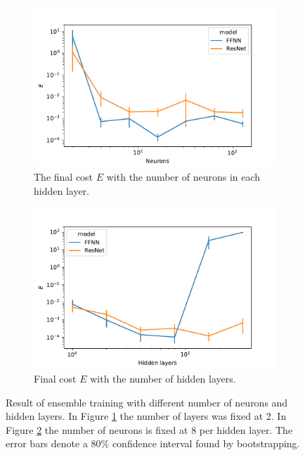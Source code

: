 \begin{figure}
    \begin{subfigure}[t]{0.5\textwidth}
        \centering
        \includegraphics[width=\linewidth]{figures/curve_1/eks_7/neurons_error.pdf}
        \caption{The final cost \(E\) with the number of neurons in each hidden layer.} \label{fig:curve_1_neuron_error} \end{subfigure}
    \begin{subfigure}[t]{0.5\textwidth}
        \centering
        \includegraphics[width=\linewidth]{figures/curve_1/eks_7/layer_error.pdf}
        \caption{Final cost \(E\) with the number of hidden layers.} \label{fig:curve_1_layer_error}
    \end{subfigure}
    \caption{Result of ensemble training with different number of neurons and hidden layers. In Figure \ref{fig:curve_1_neuron_error} the number of layers was fixed at 2. In Figure \ref{fig:curve_1_layer_error} the number of neurons is fixed at 8 per hidden layer. The error bars denote a 80\% confidence interval found by bootstrapping.} \label{fig:curve_1_parmas_eks}
\end{figure}

